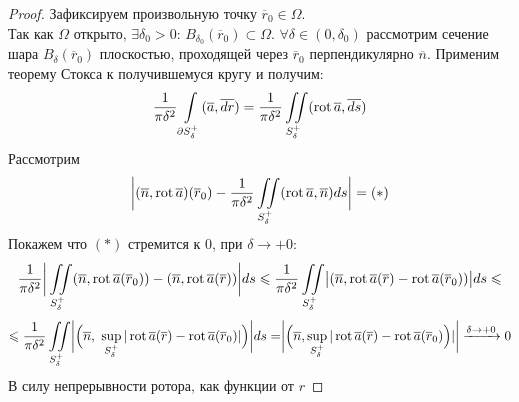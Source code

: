 \begin{proof}
    Зафиксируем произвольную точку $\overline{r}_0 \in \Omega$.\\
    Так как $\Omega$ открыто, $\exists \delta_0 > 0$: $B_{\delta_0}(\overline{r}_0) \subset \Omega$. $\forall \delta \in (0, \delta_0)$ рассмотрим сечение шара $B_\delta(\overline{r}_0)$ плоскостью, проходящей через $\overline{r}_0$ перпендикулярно $\overline{n}$. Применим теорему Стокса к получившемуся кругу и получим: \[\dfrac{1}{\pi \delta^2} \int\limits_{\partial S^+_\delta}(\overline{a}, \overline{dr}) = \dfrac{1}{\pi \delta^2} \iint\limits_{S^+_\delta} (\operatorname{rot} \overline{a}, \overline{ds})\] 
    Рассмотрим \[\biggr| (\overline{n}, \operatorname{rot} \overline{a})(\overline{r}_0) - \dfrac{1}{\pi \delta^2} \iint\limits_{S^+_\delta} (\operatorname{rot} \overline{a}, \overline{n})ds \biggr| = (*)\]
    Покажем что $(*)$ стремится к 0, при $\delta \rightarrow +0$: \[\dfrac{1}{\pi \delta^2}\biggr| \iint\limits_{S^+_\delta} (\overline{n}, \operatorname{rot} \overline{a}(\overline{r}_0)) - (\overline{n}, \operatorname{rot} \overline{a}(\overline{r}))\biggr|ds \leqslant \dfrac{1}{\pi \delta^2} \iint\limits_{S^+_\delta} \bigr| (\overline{n}, \operatorname{rot} \overline{a}(\overline{r}) - \operatorname{rot} \overline{a}(\overline{r}_0))\bigr|ds \leqslant \] \[\leq \dfrac{1}{\pi \delta^2} \iint\limits_{S^+_\delta} \biggr|\Big(\overline{n}, \ \sup\limits_{S^+_\delta}|\rot \overline{a}(\overline{r}) - \rot \overline{a}(\overline{r}_0)|\Big)\biggr|ds = \biggr| \Big(\overline{n}, \sup\limits_{S^+_\delta}|\rot \overline{a}(\overline{r}) - \rot \overline{a}(\overline{r}_0) \Big)|\biggr| \xrightarrow{\delta \rightarrow +0} 0\]
    В силу непрерывности ротора, как функции от $r $
\end{proof}
